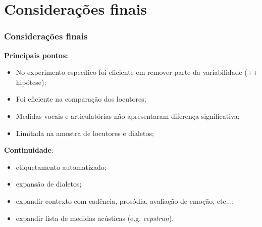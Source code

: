 \documentclass[121pt, aspectratio=169, t]{beamer}
\begin{document}
\section{Considerações finais}
\begin{frame}[fragile=singleslide]
	\frametitle{Considerações finais}
	
	\textbf{Principais pontos:}
	\begin{itemize}
		\item No experimento específico foi eficiente em remover parte da variabilidade (++ hipótese);
		\item Foi eficiente na comparação dos locutores;
		\item Medidas vocais e articulatórias não apresentaram diferença significativa;
		\item Limitada na amostra de locutores e dialetos;
	\end{itemize}
	
	\textbf{Continuidade}:
	\begin{itemize}
		\item etiquetamento automatizado;
		\item expansão de dialetos;
		\item expandir contexto com cadência, prosódia, avaliação de emoção, etc...;
		\item expandir lista de medidas acústicas (e.g. \textit{cepstrun}).
	\end{itemize}
	
\end{frame}

\end{document}
